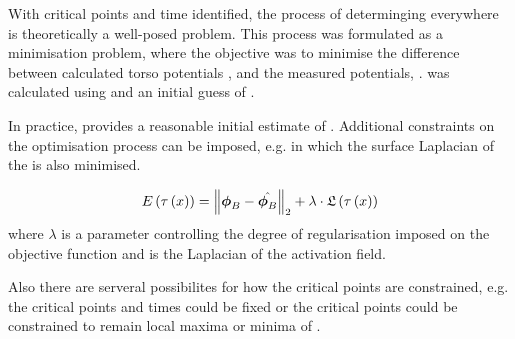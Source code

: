 With critical points and time identified, the process of determinging
 everywhere is theoretically a well-posed problem. This process
was formulated as a minimisation problem, where the objective was
to minimise the difference between calculated torso potentials \estpot,
and the measured potentials, \recpot. \estpot was calculated using
\transfer and an initial guess of .

In practice, \ZCROSS provides a reasonable initial estimate of .
Additional constraints on the optimisation process can be imposed, e.g.
\cite{huiskamp:1988} in which the surface Laplacian of the  is also
minimised. 

\begin{equation} 
        \fnof{E}{\activfn{x}} = \lnorm{2}{\recpot - \estpot} + 
                \lambda \cdot \fnof{\lapl}{\activfn{x}}
\end{equation}
where $\lambda$ is a parameter controlling the degree of regularisation imposed on
the objective function and \lapl is the Laplacian of the activation field.

Also there are serveral possibilites for how the critical points
are constrained, e.g. the critical points and times could be fixed or the 
critical points could be constrained to remain local maxima or minima of 
.

